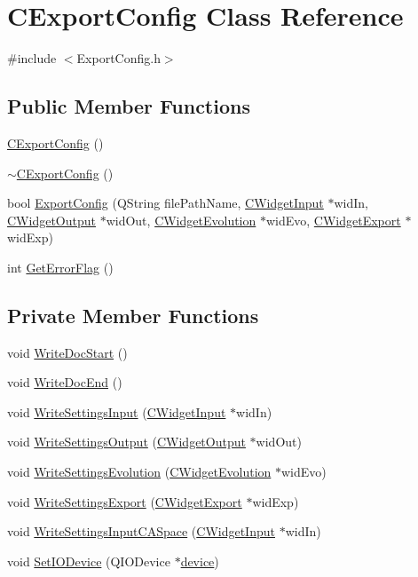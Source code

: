 \hypertarget{classCExportConfig}{
\section{CExportConfig Class Reference}
\label{classCExportConfig}
}


{\ttfamily \#include $<$ExportConfig.h$>$}\subsection*{Public Member Functions}
\begin{DoxyCompactItemize}
\item 
\hyperlink{classCExportConfig_a8165a6c6e0c15d1b63b059d10cde6d44}{CExportConfig} ()
\item 
\hyperlink{classCExportConfig_a8469245d21428fb2ceac04798ea14caa}{$\sim$CExportConfig} ()
\item 
bool \hyperlink{classCExportConfig_ace3fcad02cfbaa2bfe5bb9cb4610052a}{ExportConfig} (QString filePathName, \hyperlink{classCWidgetInput}{CWidgetInput} $\ast$widIn, \hyperlink{classCWidgetOutput}{CWidgetOutput} $\ast$widOut, \hyperlink{classCWidgetEvolution}{CWidgetEvolution} $\ast$widEvo, \hyperlink{classCWidgetExport}{CWidgetExport} $\ast$widExp)
\item 
int \hyperlink{classCExportConfig_a45d8601ab227c344d06c8f15d4afdc56}{GetErrorFlag} ()
\end{DoxyCompactItemize}
\subsection*{Private Member Functions}
\begin{DoxyCompactItemize}
\item 
void \hyperlink{classCExportConfig_a44d785a78a90004ce37fc78788ff22cf}{WriteDocStart} ()
\item 
void \hyperlink{classCExportConfig_af055c2f9bb0af94ef17b490bde396b57}{WriteDocEnd} ()
\item 
void \hyperlink{classCExportConfig_acfc482ab7655108db7236df00f98d5f3}{WriteSettingsInput} (\hyperlink{classCWidgetInput}{CWidgetInput} $\ast$widIn)
\item 
void \hyperlink{classCExportConfig_ac53bcad1b652575efb5ccc8b804e6fc0}{WriteSettingsOutput} (\hyperlink{classCWidgetOutput}{CWidgetOutput} $\ast$widOut)
\item 
void \hyperlink{classCExportConfig_aa345f949a1d6fba9c20704f5d977eccc}{WriteSettingsEvolution} (\hyperlink{classCWidgetEvolution}{CWidgetEvolution} $\ast$widEvo)
\item 
void \hyperlink{classCExportConfig_af54bae02599cec0d5fc28ab0f0f2f46d}{WriteSettingsExport} (\hyperlink{classCWidgetExport}{CWidgetExport} $\ast$widExp)
\item 
void \hyperlink{classCExportConfig_ad2d3b5c3a8e68084ed6c3b27b846ee55}{WriteSettingsInputCASpace} (\hyperlink{classCWidgetInput}{CWidgetInput} $\ast$widIn)
\item 
void \hyperlink{classCExportConfig_af5f2911f8d37299ad02027203c78d934}{SetIODevice} (QIODevice $\ast$\hyperlink{classCExportConfig_a638f31e665656264ef917946f0e384d8}{device})
\end{DoxyCompactItemize}
